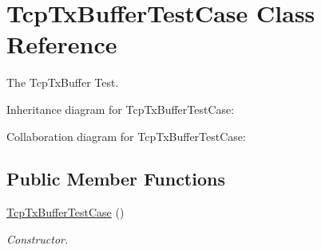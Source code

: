 \hypertarget{classTcpTxBufferTestCase}{}\section{Tcp\+Tx\+Buffer\+Test\+Case Class Reference}
\label{classTcpTxBufferTestCase}


The Tcp\+Tx\+Buffer Test.  




Inheritance diagram for Tcp\+Tx\+Buffer\+Test\+Case\+:


Collaboration diagram for Tcp\+Tx\+Buffer\+Test\+Case\+:
\subsection*{Public Member Functions}
\begin{DoxyCompactItemize}
\item 
\hyperlink{classTcpTxBufferTestCase_ad6ae95846a4022a456b3db31e92ba951}{Tcp\+Tx\+Buffer\+Test\+Case} ()
\begin{DoxyCompactList}\small\item\em Constructor. \end{DoxyCompactList}\end{DoxyCompactItemize}
